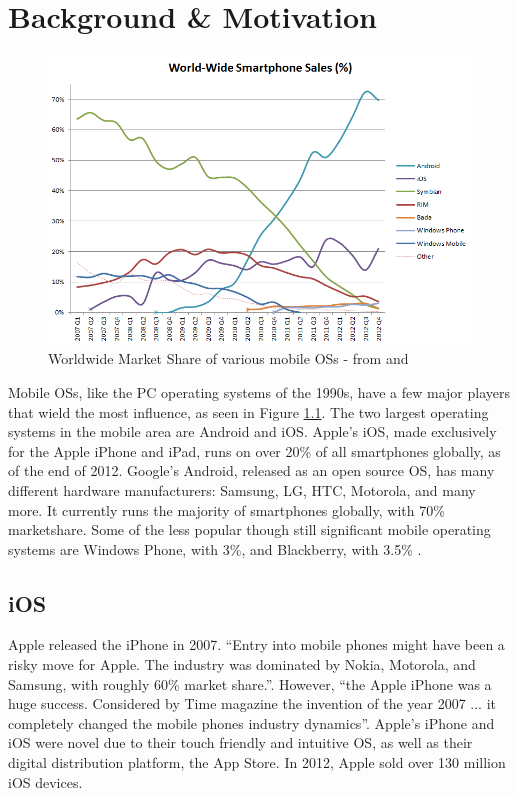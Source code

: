 \chapter{Background \& Motivation}
\label{sec:background}

\begin{figure}[h]
\begin{center}
\includegraphics[width=0.8\columnwidth]{figs/World_Wide_Smartphone_Sales_Share}
\caption{Worldwide Market Share of various mobile OSs - from \citep{wikimobileshare} and \citep{gartnerq42012}}
\label{fig:mobileshares}
\end{center}
\end{figure}


Mobile OSs, like the PC operating systems of the 1990s, have a few major players that wield the most influence, as seen in Figure \ref{fig:mobileshares}. The two largest operating systems in the mobile area are Android and iOS. Apple's iOS, made exclusively for the Apple iPhone and iPad, runs on over 20\%\citep{gartnerq42012} of all smartphones globally, as of the end of 2012. Google's Android, released as an open source OS, has many different hardware manufacturers: Samsung, LG, HTC, Motorola, and many more. It currently runs the majority of smartphones globally, with 70\%\citep{gartnerq42012}  marketshare. Some of the less popular though still significant mobile operating systems are Windows Phone, with 3\%, and Blackberry, with 3.5\%\citep{gartnerq42012} . 

\section{iOS}
Apple released the iPhone in 2007. ``Entry into mobile phones might have been a risky move for Apple. The industry was dominated by Nokia, Motorola, and Samsung, with roughly 60\% market share.''\citep{yoffie2010apple}. However, ``the Apple iPhone was a huge success. Considered by Time magazine the invention of the year 2007 ... it completely changed the mobile phones industry dynamics''\citep{reis2012leadership}. Apple's iPhone and iOS were novel due to their touch friendly and intuitive OS, as well as their digital distribution platform, the App Store\citep{yoffie2010apple}. In 2012, Apple sold over 130 million iOS devices\citep{gartnerq42012}.

